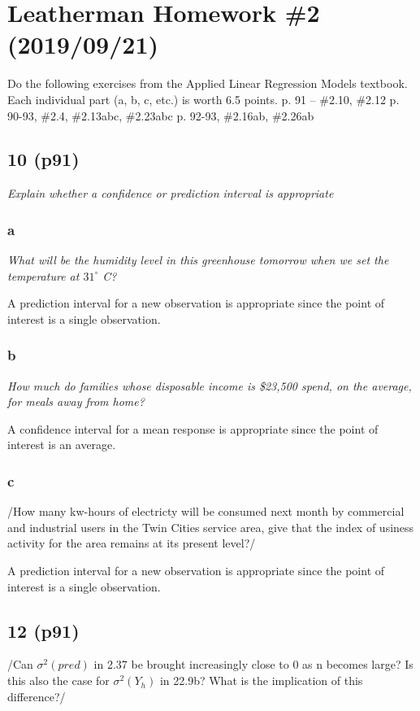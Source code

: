 \documentclass[11pt]{article}
\author{Dustin}
\date{\today}
\title{}
\begin{document}
\tableofcontents



\section{Leatherman Homework \#2 (2019/09/21)}
\label{sec:org4eb83fc}
Do the following exercises from the Applied Linear Regression Models textbook. Each individual part (a, b, c, etc.) is worth 6.5 points.
    p. 91 -- \#2.10, \#2.12
        p. 90-93, \#2.4, \#2.13abc, \#2.23abc
        p. 92-93, \#2.16ab, \#2.26ab
\subsection{10 (p91)}
\label{sec:org5c725ed}
\emph{Explain whether a confidence or prediction interval is appropriate}
\subsubsection{a}
\label{sec:org735484d}
\emph{What will be the humidity level in this greenhouse tomorrow when we set the
temperature at \(31^\circ\) C?}

A prediction interval for a new observation is appropriate since the point of
interest is a single observation.
\subsubsection{b}
\label{sec:orgb406da2}
\emph{How much do families whose disposable income is \$23,500 spend, on the average,
for meals away from home?}

A confidence interval for a mean response is appropriate since the point of
interest is an average.
\subsubsection{c}
\label{sec:org21bcd76}
/How many kw-hours of electricty will be consumed next month by commercial and
industrial users in the Twin Cities service area, give that the index of usiness
activity for the area remains at its present level?/

A prediction interval for a new observation is appropriate since the point of
interest is a single observation.
\subsection{12 (p91)}
\label{sec:org59e8837}
/Can \(\sigma^2(pred)\) in 2.37 be brought increasingly close to 0 as n becomes
large? Is this also the case for \(\sigma^2(Y_h)\) in 22.9b? What is the
implication of this difference?/
\end{document}
